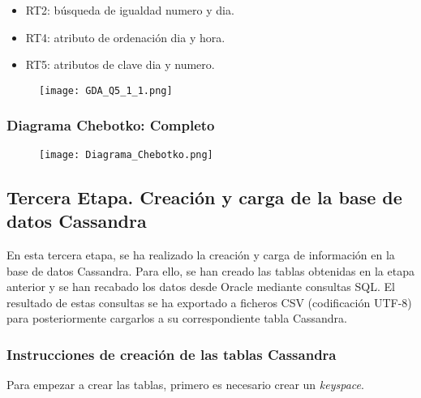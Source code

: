 \documentclass[a4paper]{article}
\begin{document}
\begin{itemize}
\begin{itemize}
        \item RT2: búsqueda de igualdad numero y dia.

        \item RT4: atributo de ordenación dia y hora.

        \item RT5: atributos de clave dia y numero.

    \end{itemize}

    \begin{figure}[H]
        \centering
        \texttt{[image: GDA\_Q5\_1\_1.png]}
        \label{fig:Q5_1_1}
    \end{figure}

\end{itemize}

\subsubsection{\Large{Diagrama Chebotko: Completo}}

\vspace{2mm}

\begin{figure}[H]
    \centering
    \texttt{[image: Diagrama\_Chebotko.png]}
    \label{fig:Chebotko}
\end{figure}

\newpage

\subsection{\huge{Tercera Etapa. Creación y carga de la base de datos Cassandra}}

En esta tercera etapa, se ha realizado la creación y carga de información en la base de datos Cassandra. Para ello, se han creado las tablas obtenidas en la etapa anterior y se han recabado los datos desde Oracle mediante consultas SQL. El resultado de estas consultas se ha exportado a ficheros CSV (codificación UTF-8) para posteriormente cargarlos a su correspondiente tabla Cassandra.

\subsubsection{\Large{Instrucciones de creación de las tablas Cassandra}}

Para empezar a crear las tablas, primero es necesario crear un \emph{keyspace}.
\end{document}

